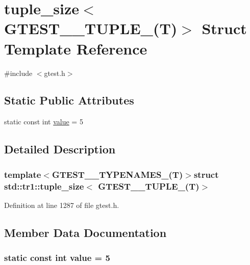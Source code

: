 \hypertarget{structstd_1_1tr1_1_1tuple__size_3_01GTEST__5__TUPLE___07T_08_4}{\section{tuple\-\_\-size$<$ \-G\-T\-E\-S\-T\-\_\-\_\-\-T\-U\-P\-L\-E\-\_\-(\-T)$>$ \-Struct \-Template \-Reference}
\label{d6/d91/structstd_1_1tr1_1_1tuple__size_3_01GTEST__5__TUPLE___07T_08_4}
}


{\ttfamily \#include $<$gtest.\-h$>$}

\subsection*{\-Static \-Public \-Attributes}
\begin{DoxyCompactItemize}
\item 
static const int \hyperlink{structstd_1_1tr1_1_1tuple__size_3_01GTEST__5__TUPLE___07T_08_4_a3851384a21258869159d444f38396c70}{value} = 5
\end{DoxyCompactItemize}


\subsection{\-Detailed \-Description}
\subsubsection*{template$<$\-G\-T\-E\-S\-T\-\_\-\_\-\-T\-Y\-P\-E\-N\-A\-M\-E\-S\-\_\-(\-T)$>$struct std\-::tr1\-::tuple\-\_\-size$<$ G\-T\-E\-S\-T\-\_\-\_\-\-T\-U\-P\-L\-E\-\_\-(\-T)$>$}



\-Definition at line 1287 of file gtest.\-h.



\subsection{\-Member \-Data \-Documentation}
\hypertarget{structstd_1_1tr1_1_1tuple__size_3_01GTEST__5__TUPLE___07T_08_4_a3851384a21258869159d444f38396c70}{
\subsubsection[{value}]{\setlength{\rightskip}{0pt plus 5cm}static const int {\bf value} = 5}}\label{d6/d91/structstd_1_1tr1_1_1tuple__size_3_01GTEST__5__TUPLE___07T_08_4_a3851384a21258869159d444f38396c70}


